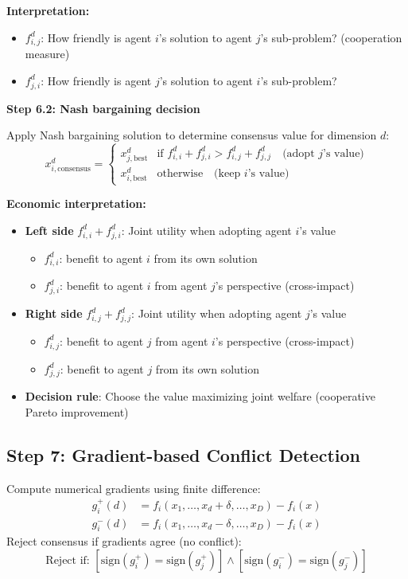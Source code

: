 \documentclass[11pt,a4paper]{article}
\begin{document}
\textbf{Interpretation:}
\begin{itemize}
    \item $f_{i,j}^d$: How friendly is agent $i$'s solution to agent $j$'s sub-problem? (cooperation measure)
    \item $f_{j,i}^d$: How friendly is agent $j$'s solution to agent $i$'s sub-problem?
\end{itemize}

\textbf{Step 6.2: Nash bargaining decision}

Apply Nash bargaining solution to determine consensus value for dimension $d$:
\begin{equation}
x_{i,\text{consensus}}^d = \begin{cases}
x_{j,\text{best}}^d & \text{if } f_{i,i}^d + f_{j,i}^d > f_{i,j}^d + f_{j,j}^d \quad \text{(adopt } j\text{'s value)} \\
x_{i,\text{best}}^d & \text{otherwise} \quad \text{(keep } i\text{'s value)}
\end{cases}
\end{equation}

\textbf{Economic interpretation:}
\begin{itemize}
    \item \textbf{Left side} $f_{i,i}^d + f_{j,i}^d$: Joint utility when adopting agent $i$'s value
    \begin{itemize}
        \item $f_{i,i}^d$: benefit to agent $i$ from its own solution
        \item $f_{j,i}^d$: benefit to agent $i$ from agent $j$'s perspective (cross-impact)
    \end{itemize}
    \item \textbf{Right side} $f_{i,j}^d + f_{j,j}^d$: Joint utility when adopting agent $j$'s value
    \begin{itemize}
        \item $f_{i,j}^d$: benefit to agent $j$ from agent $i$'s perspective (cross-impact)
        \item $f_{j,j}^d$: benefit to agent $j$ from its own solution
    \end{itemize}
    \item \textbf{Decision rule}: Choose the value maximizing joint welfare (cooperative Pareto improvement)
\end{itemize}

\subsection{Step 7: Gradient-based Conflict Detection}
Compute numerical gradients using finite difference:
\begin{align}
g_i^{+}(d) &= f_i(x_1, \ldots, x_d + \delta, \ldots, x_D) - f_i(x) \\
g_i^{-}(d) &= f_i(x_1, \ldots, x_d - \delta, \ldots, x_D) - f_i(x)
\end{align}
Reject consensus if gradients agree (no conflict):
\begin{equation}
\text{Reject if: } [\text{sign}(g_i^+) = \text{sign}(g_j^+)] \land [\text{sign}(g_i^-) = \text{sign}(g_j^-)]
\end{equation}
\end{document}
